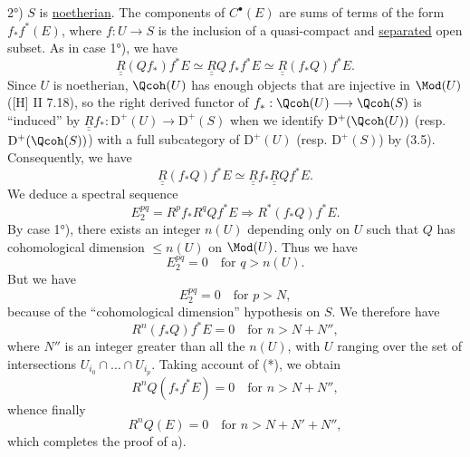 2°) $S$ is \uline{noetherian}. The components of $C^\bullet(E)$ are sums of terms of the form $f_*f^*(E)$, where $f:U\longrightarrow S$ is the inclusion of a quasi-compact and \uline{separated} open subset. As in case 1°), we have
%
\begin{equation}\tag{*}
 \underline{\underline{R}}(Qf_*)f^*E\simeq \underline{\underline{R}}Q\,f_*f^*E\simeq \underline{\underline{R}}(f_*Q)f^*E.
\end{equation}
Since $U$ is noetherian, $\Qcoh(U)$ has enough objects that are injective in $\Mod(U)$ ([H] II 7.18), so the right derived functor of $f_*:\Qcoh(U)\longrightarrow\Qcoh(S)$ is \textquotedblleft induced\textquotedblright{} by $\underline{\underline{R}}f_*:\mathrm D^+(U)\longrightarrow\mathrm D^+(S)$ when we identify $\mathrm D^+(\Qcoh(U))$ (resp. $\mathrm D^+(\Qcoh(S))$) with a full subcategory of $\mathrm D^+(U)$ (resp. $\mathrm D^+(S)$) by (3.5). Consequently, we have
\[
 \underline{\underline{R}}(f_*Q)f^*E\simeq \underline{\underline{R}}f_*\underline{\underline{R}}Qf^*E.
\]
We deduce a spectral sequence
\[
 E_2^{pq}=R^pf_*R^qQf^*E\Longrightarrow R^{*}(f_*Q)f^*E.
\]
By case 1°), there exists an integer $n(U)$ depending only on $U$ such that $Q$ has cohomological dimension $\leq n(U)$ on $\Mod(U)$. Thus we have
\[
 E_2^{pq}=0\quad\text{for }q>n(U).
\]
But we have
\[
 E_2^{pq}=0\quad\text{for }p>N,
\]
because of the \textquotedblleft cohomological dimension\textquotedblright{} hypothesis on $S$. We therefore have
\[
 R^n(f_*Q)f^*E=0\quad\text{for }n>N+N'',
\]
where $N''$ is an integer greater than all the $n(U)$, with $U$ ranging over the set of intersections $U_{i_0}\cap\ldots\cap U_{i_p}$. Taking account of (*), we obtain
\[
 R^nQ(f_*f^*E)=0\quad\text{for }n>N+N'',
\]
whence finally
\[
 R^nQ(E)=0\quad\text{for }n>N+N'+N'',
\]
%
which completes the proof of a).

